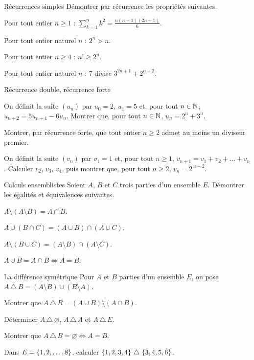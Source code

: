 \begin{exercice}[2]{Récurrences simples}
Démontrer par récurrence les propriétés suivantes.
\begin{questions}
  \item Pour tout entier $n\geq1$ :
    $\displaystyle\sum_{k=1}^{n}k^{2}=\frac{n(n+1)(2n+1)}{6}$.
  \item Pour tout entier naturel $n$ : $2^{n}>n$.
  \item Pour tout entier $n\geq4$ : $n!\geq2^{n}$.
  \item Pour tout entier naturel $n$ : $7$ divise $3^{2n+1}+2^{n+2}$.
\end{questions}
\end{exercice}

\begin{exercice}[2]{Récurrence double, récurrence forte}
\begin{questions}
  \item On définit la suite $(u_n)$ par $u_0=2$, $u_1=5$ et, pour tout
    $n\in\mathbb{N}$, $u_{n+2}=5u_{n+1}-6u_n$. Montrer que, pour tout $n\in\mathbb{N}$,
    $u_n=2^{n}+3^{n}$.
  \item Montrer, par récurrence forte, que tout entier $n\geq2$ admet au
    moins un diviseur premier.
  \item On définit la suite $(v_n)$ par $v_1=1$ et, pour tout $n\geq1$,
    $v_{n+1}=v_1+v_2+\dots+v_n$. Calculer $v_2$, $v_3$, $v_4$, puis montrer
    que, pour tout $n\geq2$, $v_n=2^{\,n-2}$.
\end{questions}
\end{exercice}

\begin{exercice}[2]{Calculs ensemblistes}
Soient $A$, $B$ et $C$ trois parties d'un ensemble $E$. Démontrer les
égalités et équivalences suivantes.
\begin{questions}
  \item $A\setminus(A\setminus B)=A\cap B$.
  \item $A\cup(B\cap C)=(A\cup B)\cap(A\cup C)$.
  \item $A\setminus(B\cup C)=(A\setminus B)\cap(A\setminus C)$.
  \item $A\cup B=A\cap B\iff A=B$.
\end{questions}
\end{exercice}

\begin{exercice}[2]{La différence symétrique}
Pour $A$ et $B$ parties d'un ensemble $E$, on pose
$A\,\triangle\,B=(A\setminus B)\cup(B\setminus A)$.
\begin{questions}
  \item Montrer que $A\,\triangle\,B=(A\cup B)\setminus(A\cap B)$.
  \item Déterminer $A\,\triangle\,\varnothing$, $A\,\triangle\,A$ et
    $A\,\triangle\,E$.
  \item Montrer que $A\,\triangle\,B=\varnothing\iff A=B$.
  \item Dans $E=\left\{1,2,\dots,8\right\}$, calculer
    $\left\{1,2,3,4\right\}\,\triangle\,\left\{3,4,5,6\right\}$.
\end{questions}
\end{exercice}

